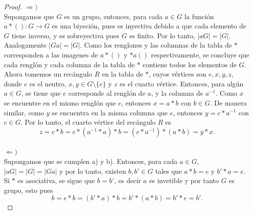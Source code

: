 \documentclass[11pt,letterpaper]{article}
\begin{document}
\begin{proof}
    \(\Rightarrow )\) \\[10pt]
    Supongamos que \(G\) es un grupo, entonces, para cada \(a\in G\) la funci\'on \(a* ():G\rightarrow G\) es una biyeción, pues es inyectiva debido 
    a que cada elemento de \(G\) tiene inverso, y es sobreyectiva pues \(G\) es finito. Por lo tanto, \(|aG|=|G|\). Analogamente \(|Ga|=|G|\). 
    Como los renglones y las columnas de la tabla de \(*\) corresponden a las imagenes de \(a*()\) y \(*a()\) respectivamente, se concluye que cada 
    rengl\'on y cada columna de la tabla de \(*\) contiene todos los elementos de \(G\).\\
    Ahora tomemos un rec\'angulo \(R\) en la tabla de \(*\), cuyos v\'ertices son \(e,x,y,z\), donde \(e\) es el neutro, \(x,y \in G\setminus\{e\}\) y \(z\) 
    es el cuarto v\'ertice. Entonces, para alg\'un \(a\in G\), se tiene que \(e\) corresponde al rengl\'on de \(a\), y la columna de \(a^{-1}\). Como \(x\) 
    se encuentre en el mismo rengl\'on que \(e\), entonces \(x=a*b\) con \(b\in G\). De manera similar, como \(y\) se encuentra en la misma columna que \(e\), 
    entonces \(y=c*a^{-1}\) con \(c\in G\). Por lo tanto, el cuarto v\'ertice del rec\'angulo \(R\) es 
    \[z=c*b=c*(a^{-1}*a)*b=(c*a^{-1})*(a*b)=y*x.\] \\[10pt]
    \(\Leftarrow )\) \\[10pt]
        Supongamos que se cumplen a) y b). Entonces, para cada \(a\in G\), \(|aG|=|G|=|Ga|\) y por lo tanto, existen \(b,b' \in G\) tales que 
        \(a*b=e\) y \(b'*a=e\). Si \(*\) es asociativa, se sigue que \(b=b'\), es decir \(a\) es invetible y por tanto \(G\) es grupo, esto pues 
        \[b=e*b=(b'*a)*b=b'*(a*b)=b'*e=b'.\]
\end{proof}
\end{document}
